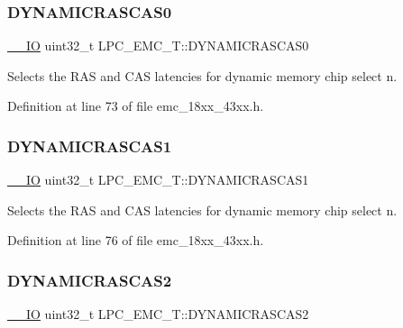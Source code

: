 \subsubsection{\texorpdfstring{D\+Y\+N\+A\+M\+I\+C\+R\+A\+S\+C\+A\+S0}{DYNAMICRASCAS0}}
{\footnotesize\ttfamily \hyperlink{core__sc300_8h_aec43007d9998a0a0e01faede4133d6be}{\+\_\+\+\_\+\+IO} uint32\+\_\+t L\+P\+C\+\_\+\+E\+M\+C\+\_\+\+T\+::\+D\+Y\+N\+A\+M\+I\+C\+R\+A\+S\+C\+A\+S0}

Selects the R\+AS and C\+AS latencies for dynamic memory chip select n. 

Definition at line 73 of file emc\+\_\+18xx\+\_\+43xx.\+h.

\mbox{\label{struct_l_p_c___e_m_c___t_aa94607ecd569d4363fab430430467c74}} 
\subsubsection{\texorpdfstring{D\+Y\+N\+A\+M\+I\+C\+R\+A\+S\+C\+A\+S1}{DYNAMICRASCAS1}}
{\footnotesize\ttfamily \hyperlink{core__sc300_8h_aec43007d9998a0a0e01faede4133d6be}{\+\_\+\+\_\+\+IO} uint32\+\_\+t L\+P\+C\+\_\+\+E\+M\+C\+\_\+\+T\+::\+D\+Y\+N\+A\+M\+I\+C\+R\+A\+S\+C\+A\+S1}

Selects the R\+AS and C\+AS latencies for dynamic memory chip select n. 

Definition at line 76 of file emc\+\_\+18xx\+\_\+43xx.\+h.

\mbox{\label{struct_l_p_c___e_m_c___t_a3a782292716443cab3f48507917f4598}} 
\subsubsection{\texorpdfstring{D\+Y\+N\+A\+M\+I\+C\+R\+A\+S\+C\+A\+S2}{DYNAMICRASCAS2}}
{\footnotesize\ttfamily \hyperlink{core__sc300_8h_aec43007d9998a0a0e01faede4133d6be}{\+\_\+\+\_\+\+IO} uint32\+\_\+t L\+P\+C\+\_\+\+E\+M\+C\+\_\+\+T\+::\+D\+Y\+N\+A\+M\+I\+C\+R\+A\+S\+C\+A\+S2}


